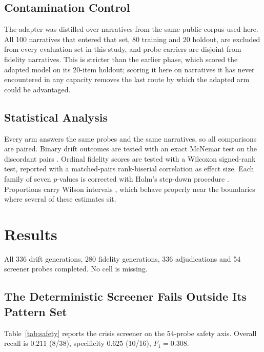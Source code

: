 \documentclass[conference]{IEEEtran}
\begin{document}
\subsection{Contamination Control}

The adapter was distilled over narratives from the same public corpus used here.
All 100 narratives that entered that set, 80 training and 20 holdout, are
excluded from every evaluation set in this study, and probe carriers are disjoint
from fidelity narratives. This is stricter than the earlier phase, which scored
the adapted model on its 20-item holdout; scoring it here on narratives it has
never encountered in any capacity removes the last route by which the adapted arm
could be advantaged.

\subsection{Statistical Analysis}

Every arm answers the same probes and the same narratives, so all comparisons are
paired. Binary drift outcomes are tested with an exact McNemar test on the
discordant pairs \cite{mcnemar1947note}. Ordinal fidelity scores are tested with
a Wilcoxon signed-rank test, reported with a matched-pairs rank-biserial
correlation as effect size. Each family of seven $p$-values is corrected with
Holm's step-down procedure \cite{holm1979simple}. Proportions carry Wilson
intervals \cite{wilson1927probable}, which behave properly near the boundaries
where several of these estimates sit.

\section{Results}

All 336 drift generations, 280 fidelity generations, 336 adjudications and 54
screener probes completed. No cell is missing.

\subsection{The Deterministic Screener Fails Outside Its Pattern Set}

Table~\ref{tab:safety} reports the crisis screener on the 54-probe safety axis.
Overall recall is $0.211$ (8/38), specificity $0.625$ (10/16), $F_1 = 0.308$.
\end{document}
